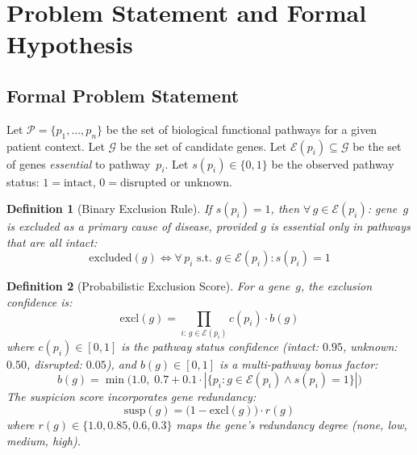 \documentclass[12pt,a4paper]{article}
\newtheorem{definition}{Definition}
\begin{document}
\section{Problem Statement and Formal Hypothesis}
\label{sec:problem}

\subsection{Formal Problem Statement}

Let $\mathcal{P} = \{p_1, \ldots, p_n\}$ be the set of biological functional pathways for a given patient context. Let $\mathcal{G}$ be the set of candidate genes. Let $\mathcal{E}(p_i) \subseteq \mathcal{G}$ be the set of genes \emph{essential} to pathway~$p_i$. Let $s(p_i) \in \{0, 1\}$ be the observed pathway status: $1 = \text{intact}$, $0 = \text{disrupted or unknown}$.

\begin{definition}[Binary Exclusion Rule]
\label{def:binary}
If $s(p_i) = 1$, then $\forall\, g \in \mathcal{E}(p_i)$: gene~$g$ is \emph{excluded} as a primary cause of disease, provided $g$ is essential only in pathways that are all intact:
\begin{equation}
    \text{excluded}(g) \iff \forall\, p_i \text{ s.t. } g \in \mathcal{E}(p_i): s(p_i) = 1
\end{equation}
\end{definition}

\begin{definition}[Probabilistic Exclusion Score]
\label{def:probabilistic}
For a gene~$g$, the exclusion confidence is:
\begin{equation}
    \text{excl}(g) = \prod_{i:\, g \in \mathcal{E}(p_i)} c(p_i) \cdot b(g)
\end{equation}
where $c(p_i) \in [0,1]$ is the pathway status confidence (intact: $0.95$, unknown: $0.50$, disrupted: $0.05$), and $b(g) \in [0,1]$ is a multi-pathway bonus factor:
\begin{equation}
    b(g) = \min\!\Big(1.0,\; 0.7 + 0.1 \cdot |\{p_i : g \in \mathcal{E}(p_i) \wedge s(p_i) = 1\}|\Big)
\end{equation}
The \emph{suspicion score} incorporates gene redundancy:
\begin{equation}
    \text{susp}(g) = \big(1 - \text{excl}(g)\big) \cdot r(g)
\end{equation}
where $r(g) \in \{1.0, 0.85, 0.6, 0.3\}$ maps the gene's redundancy degree (none, low, medium, high).
\end{definition}
\end{document}
